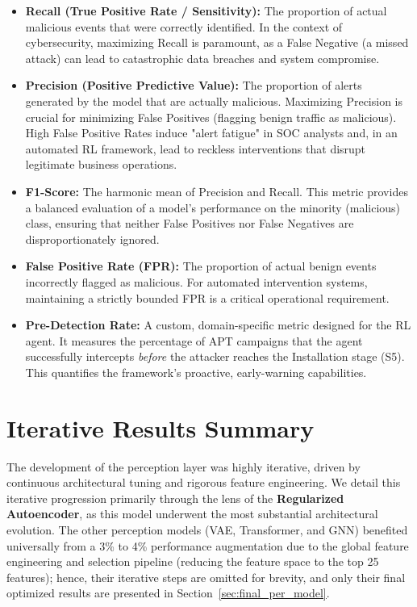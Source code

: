 \begin{itemize}
    \item \textbf{Recall (True Positive Rate / Sensitivity):} The proportion of actual malicious events that were correctly identified. In the context of cybersecurity, maximizing Recall is paramount, as a False Negative (a missed attack) can lead to catastrophic data breaches and system compromise.
    
    \item \textbf{Precision (Positive Predictive Value):} The proportion of alerts generated by the model that are actually malicious. Maximizing Precision is crucial for minimizing False Positives (flagging benign traffic as malicious). High False Positive Rates induce "alert fatigue" in SOC analysts and, in an automated RL framework, lead to reckless interventions that disrupt legitimate business operations.
    
    \item \textbf{F1-Score:} The harmonic mean of Precision and Recall. This metric provides a balanced evaluation of a model's performance on the minority (malicious) class, ensuring that neither False Positives nor False Negatives are disproportionately ignored.
    
    \item \textbf{False Positive Rate (FPR):} The proportion of actual benign events incorrectly flagged as malicious. For automated intervention systems, maintaining a strictly bounded FPR is a critical operational requirement.
    
    \item \textbf{Pre-Detection Rate:} A custom, domain-specific metric designed for the RL agent. It measures the percentage of APT campaigns that the agent successfully intercepts \textit{before} the attacker reaches the Installation stage (S5). This quantifies the framework's proactive, early-warning capabilities.
\end{itemize}

\section{Iterative Results Summary}
\label{sec:iterative_results}

The development of the perception layer was highly iterative, driven by continuous architectural tuning and rigorous feature engineering. We detail this iterative progression primarily through the lens of the \textbf{Regularized Autoencoder}, as this model underwent the most substantial architectural evolution. The other perception models (VAE, Transformer, and GNN) benefited universally from a 3\% to 4\% performance augmentation due to the global feature engineering and selection pipeline (reducing the feature space to the top 25 features); hence, their iterative steps are omitted for brevity, and only their final optimized results are presented in Section~\ref{sec:final_per_model}.

